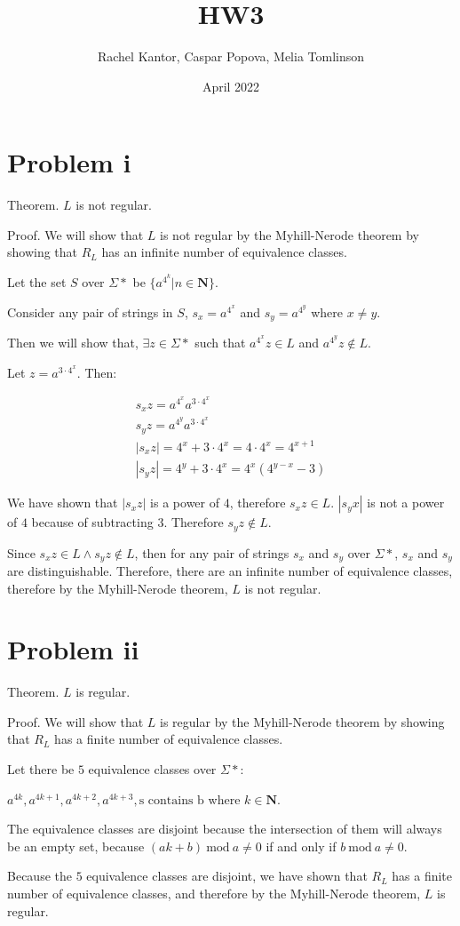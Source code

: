 \documentclass{article}
\title{HW3}
\author{Rachel Kantor, Caspar Popova, Melia Tomlinson}
\date{April 2022}
\begin{document}
\maketitle

\section{Problem i}

Theorem. $L$ is not regular.

\noindent Proof. We will show that $L$ is not regular by the Myhill-Nerode theorem by showing that $R_L$ has an infinite number of equivalence classes.

\noindent Let the set $S$ over $\Sigma *$ be $\{a^{4^k} | n \in \mathbf{N}\}$.

\noindent Consider any pair of strings in $S$, $s_x = a^{4^x}$ and $s_y = a^{4^y}$ where $x \neq y$.

\noindent Then we will show that, $\exists z \in \Sigma *$ such that $a^{4^x} z \in L$ and $a^{4^y} z \notin L$.

\noindent Let $z=a^{3 \cdot 4^x}$. Then:

\begin{align*}
    s_x z = a^{4^x} a^{3 \cdot 4^x} \\
    s_y z = a^{4^y} a^{3 \cdot 4^x} \\
    |s_x z| = 4^x + 3 \cdot 4^x = 4 \cdot 4^x  = 4^{x+1} \\
    |s_y z| = 4^y + 3 \cdot 4^x = 4^x ( 4^{y-x} - 3)
\end{align*}

\noindent We have shown that $|s_x z|$ is a power of $4$, therefore $s_x z \in L$. $|s_y x|$ is not a power of $4$ because of subtracting $3$. Therefore $s_y z \notin L$.

\noindent Since $s_x z \in L \wedge s_y z \notin L$, then for any pair of strings $s_x$ and $s_y$ over $\Sigma *$, $s_x$ and $s_y$ are distinguishable. Therefore, there are an infinite number of equivalence classes, therefore by the Myhill-Nerode theorem, $L$ is not regular.

\section{Problem ii}

Theorem. $L$ is regular.

\noindent Proof. We will show that $L$ is regular by the Myhill-Nerode theorem by showing that $R_L$ has a finite number of equivalence classes. 

\noindent Let there be $5$ equivalence classes over $\Sigma *$:

$a^{4k}, a^{4k+1}, a^{4k+2}, a^{4k+3}, \text{s contains b}$ where $k \in \mathbf{N}$.

\noindent The equivalence classes are disjoint because the intersection of them will always be an empty set, because $(ak+b) \ \text{mod} \ a \neq 0$ if and only if $b \ \text{mod} \ a \neq 0$.

\noindent Because the $5$ equivalence classes are disjoint, we have shown that $R_L$ has a finite number of equivalence classes, and therefore by the Myhill-Nerode theorem, $L$ is regular.
\end{document}
